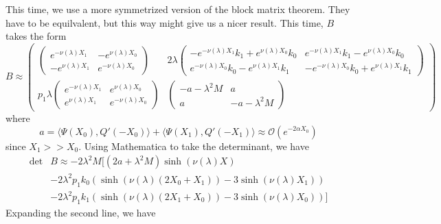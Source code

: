 \documentclass[thesis.tex]{subfiles}
\begin{document}
This time, we use a more symmetrized version of the block matrix theorem. They have to be equilvalent, but this way might give us a nicer result. This time, $B$ takes the form
\[
B \approx \begin{pmatrix}
\begin{pmatrix}
e^{-\nu(\lambda)X_1} & -e^{\nu(\lambda)X_0} \\
-e^{\nu(\lambda)X_1} & e^{-\nu(\lambda)X_0} 
\end{pmatrix} &
2 \lambda \begin{pmatrix}
-e^{-\nu(\lambda)X_1} k_1 + e^{\nu(\lambda)X_0} k_0 & e^{-\nu(\lambda)X_1} k_1 - e^{\nu(\lambda)X_0} k_0 \\ e^{-\nu(\lambda)X_0} k_0 - e^{\nu(\lambda)X_1} k_1 & -e^{-\nu(\lambda)X_0} k_0 + e^{\nu(\lambda)X_1} k_1
\end{pmatrix} \\
p_1 \lambda
\begin{pmatrix}
e^{-\nu(\lambda)X_1} & e^{\nu(\lambda)X_0} \\
e^{\nu(\lambda)X_1} & e^{-\nu(\lambda)X_0} 
\end{pmatrix} &
\begin{pmatrix}
-a - \lambda^2 M & a \\
a & -a - \lambda^2 M
\end{pmatrix}
\end{pmatrix}
\]
where
\[
a = \langle \Psi(X_0), Q'(-X_0) \rangle
+ \langle \Psi(X_1), Q'(-X_1) \rangle \approx \mathcal{O}(e^{-2\alpha X_0})
\]
since $X_1 >> X_0$. Using Mathematica to take the determinant, we have
\begin{align*}
\det &B \approx -2 \lambda^2 M \Big[ (2a + \lambda^2 M) \sinh(\nu(\lambda)X) \\
&- 2 \lambda^2 p_1 k_0 \left( \sinh(\nu(\lambda)(2 X_0 + X_1)) - 3 \sinh(\nu(\lambda)X_1)  \right) \\
&- 2 \lambda^2 p_1 k_1 \left( \sinh(\nu(\lambda)(2 X_1 + X_0)) - 3 \sinh(\nu(\lambda)X_0)  \right) \Big] 
\end{align*}
Expanding the second line, we have
\end{document}
